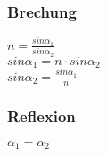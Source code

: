 \subsubsection{Brechung} 
\begin{minipage}{0.45\textwidth} 
$ n = \frac{sin\alpha _{1} }{sin\alpha _{2} } $\\ 
$ sin\alpha _{1}  = n\cdot sin\alpha _{2} $\\ 
$ sin\alpha _{2}  = \frac{sin\alpha _{1} }{ n} $\\ 
\end{minipage} 
\begin{minipage}{0.45\textwidth} 
 
\end{minipage} 
\subsubsection{Reflexion} 
\begin{minipage}{0.45\textwidth} 
$ \alpha _{1}  = \alpha _{2} $\\ 
\end{minipage} 
\begin{minipage}{0.45\textwidth} 
 
\end{minipage} 
